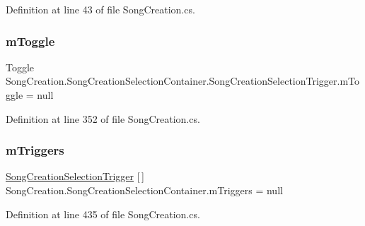 Definition at line 43 of file Song\+Creation.\+cs.

\mbox{\label{group___s_c_handlers_gaffc6248c907c4357b0a0a30b86635f3a}} 
\subsubsection{\texorpdfstring{m\+Toggle}{mToggle}\hspace{0.1cm}{\footnotesize\ttfamily [2/2]}}
{\footnotesize\ttfamily Toggle Song\+Creation.\+Song\+Creation\+Selection\+Container.\+Song\+Creation\+Selection\+Trigger.\+m\+Toggle = null\hspace{0.3cm}{\ttfamily [private]}}



Definition at line 352 of file Song\+Creation.\+cs.

\mbox{\label{group___s_c_handlers_ga89fbb92f878e65f27bee6edbf920da22}} 
\subsubsection{\texorpdfstring{m\+Triggers}{mTriggers}}
{\footnotesize\ttfamily \hyperlink{group___s_c_handlers_class_song_creation_1_1_song_creation_selection_container_1_1_song_creation_selection_trigger}{Song\+Creation\+Selection\+Trigger} \mbox{[}$\,$\mbox{]} Song\+Creation.\+Song\+Creation\+Selection\+Container.\+m\+Triggers = null\hspace{0.3cm}{\ttfamily [private]}}



Definition at line 435 of file Song\+Creation.\+cs.

